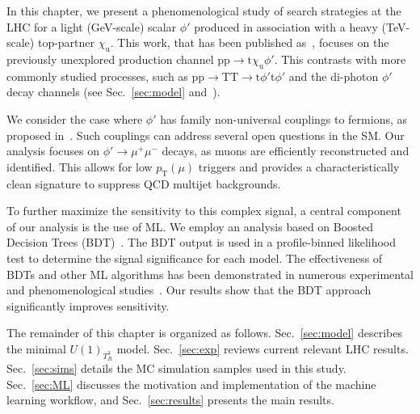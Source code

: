 In this chapter, we present a phenomenological study of search strategies at the LHC for a light (GeV-scale) scalar $\phi'$ produced in association with a heavy (TeV-scale) top-partner $\chi_\mathrm{u}$. This work, that  has been published as~\parencite{Qureshi:2024naw}, focuses on the previously unexplored production channel $\mathrm{pp}\to \mathrm{t}\chi_\mathrm{u}\phi'$. This contrasts with more commonly studied processes, such as $\mathrm{pp}\to \mathrm{T}\mathrm{T}\to \mathrm{t}\phi'\mathrm{t}\phi'$ and the di-photon $\phi'$ decay channels (see Sec.~\ref{sec:model} and~\parencite{Bhardwaj_2022, Bhardwaj_2022_2, Bardhan_2023, Banerjee_2016, Alves_2024}).

We consider the case where $\phi'$ has family non-universal couplings to fermions, as proposed in~\parencite{Dutta2020}. Such couplings can address several open questions in the SM. Our analysis focuses on $\phi'\to\mu^+\mu^-$ decays, as muons are efficiently reconstructed and identified. This allows for low $p_{\mathrm{T}}(\mu)$ triggers and provides a characteristically clean signature to suppress QCD multijet backgrounds.

To further maximize the sensitivity to this complex signal, a central component of our analysis is the use of ML. We employ an analysis based on Boosted Decision Trees (BDT)~\parencite{friedman_greedy_2001}. The BDT output is used in a profile-binned likelihood test to determine the signal significance for each model. The effectiveness of BDTs and other ML algorithms has been demonstrated in numerous experimental and phenomenological studies~\parencite{Ai:2022qvs, ATLAS:2017fak, Biswas:2018snp, Chung:2020ysf, Feng:2021eke, ttZprime, Chigusa:2022svv, Arganda2024, Ajmal_2024, Dutta_2015}. Our results show that the BDT approach significantly improves sensitivity.


The remainder of this chapter is organized as follows. Sec.~\ref{sec:model} describes the minimal $U(1)_{T^3_R}$ model. Sec.~\ref{sec:exp} reviews current relevant LHC results. Sec.~\ref{sec:sims} details the MC simulation samples used in this study. Sec.~\ref{sec:ML} discusses the motivation and implementation of the machine learning workflow, and Sec.~\ref{sec:results} presents the main results.






